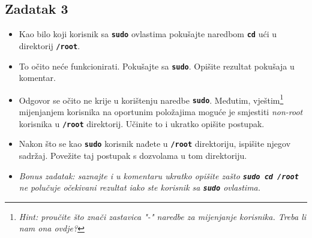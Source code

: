 \documentclass[12pt,a4paper]{article}
\newcommand{\shell}[1]{\texttt{\textbf{#1}}}
\begin{document}
  \subsection*{Zadatak 3}
    \begin{itemize}
      \item Kao bilo koji korisnik sa \shell{sudo} ovlastima pokušajte naredbom \shell{cd} ući u direktorij \shell{/root}.
      \item To očito neće funkcionirati. Pokušajte sa \shell{sudo}. Opišite rezultat pokušaja u komentar.
      \item Odgovor se očito ne krije u korištenju naredbe \shell{sudo}. Međutim, vještim\footnote{\textit{Hint: proučite što znači zastavica "-" naredbe za mijenjanje korisnika. Treba li nam ona ovdje?}} mijenjanjem korisnika na oportunim položajima moguće je smjestiti \textit{non-root} korisnika u \shell{/root} direktorij. Učinite to i ukratko opišite postupak.
      \item Nakon što se kao \shell{sudo} korisnik nađete u \shell{/root} direktoriju, ispišite njegov sadržaj. Povežite taj postupak s dozvolama u tom direktoriju.

      \item \textit{Bonus zadatak: saznajte i u komentaru ukratko opišite zašto \shell{sudo cd /root} ne polučuje očekivani rezultat iako ste korisnik sa \shell{sudo} ovlastima.}
    \end{itemize}
\end{document}
